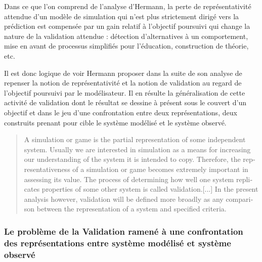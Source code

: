 
Dans ce que l'on comprend de l'analyse d'Hermann, la perte de représentativité attendue d'un modèle de simulation qui n'est plus strictement dirigé vers la prédiction est compensée par un gain relatif à l'objectif poursuivi qui change la nature de la validation attendue : détection d'alternatives à un comportement, mise en avant de processus simplifiés pour l'éducation, construction de théorie, etc.

Il est donc logique de voir Hermann proposer dans la suite de son analyse de repenser la notion de représentativité et la notion de validation au regard de l'objectif poursuivi par le modélisateur. Il en résulte la généralisation de cette activité de validation dont le résultat se dessine à présent sous le couvert d'un objectif et dans le jeu d'une confrontation entre deux représentations, deux construits prenant pour cible le système modélisé et le système observé.

\foreignblockquote{english}[{\cite[216]{Hermann1967}}]{A simulation or game is the partial representation of some independent system. Usually we are interested in simulation as a means for increasing our understanding of the system it is intended to copy. Therefore, the representativeness of a simulation or game becomes extremely important in assessing its value. The process of determining how well one system replicates properties of some other system is called validation.[...] In the present analysis however, validation will be defined more broadly as any comparison between the representation of a system and specified criteria.}

\subsubsection{Le problème de la Validation ramené à une confrontation des représentations entre système modélisé et système observé}
\label{sssec:confrontation_sysmodelise_sysobserve}


